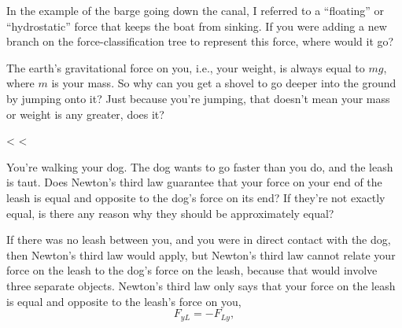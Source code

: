 \pagebreak

\startdqs

\begin{dq}
In the example of the barge going down the canal, I
referred to a ``floating'' or ``hydrostatic'' force that
keeps the boat from sinking. If you were adding a new branch
on the force-classification tree to represent this
force, where would it go?
\end{dq}

\begin{dq}\label{dq:shovel}
The earth's gravitational force on you, i.e., your weight,
is always equal to $mg$, where $m$ is your mass. So why
can you get a shovel to go deeper into the ground by jumping
onto it? Just because you're jumping, that doesn't mean your
mass or weight is any greater, does it?
\end{dq}

<%
<%

You're walking your dog. The dog wants to go faster than you
do, and the leash is taut. Does Newton's third law guarantee
that your force on your end of the leash is equal and
opposite to the dog's force on its end? If they're not
exactly equal, is there any reason why they should be
approximately equal?

If there was no leash between you, and you were in direct
contact with the dog, then Newton's third law would apply,
but Newton's third law cannot relate your force on the leash
to the dog's force on the leash, because that would involve
three separate objects. Newton's third law only says that
your force on the leash is equal and opposite to the
leash's force on you,
\begin{equation*}
        F_{yL}  =  - F_{Ly}  ,
\end{equation*}

